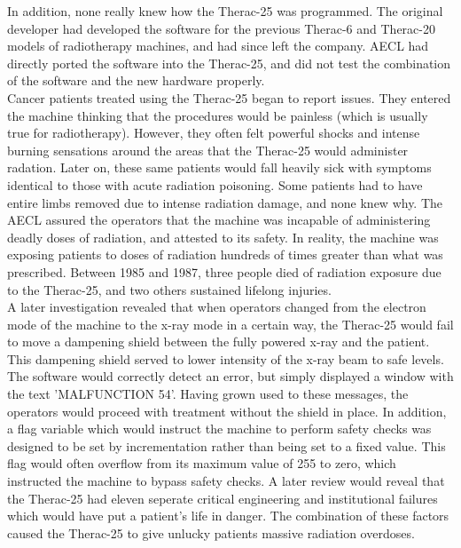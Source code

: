 \documentclass{article}
\begin{document}
In addition, none really knew how the Therac-25 was programmed. The original developer had developed the software for the previous Therac-6 and Therac-20 models of radiotherapy machines, and had since left the company. AECL had directly ported the software into the Therac-25, and did not test the combination of the software and the new hardware properly.\\

Cancer patients treated using the Therac-25 began to report issues. They entered the machine thinking that the procedures would be painless (which is usually true for radiotherapy). However, they often felt powerful shocks and intense burning sensations around the areas that the Therac-25 would administer radation. Later on, these same patients would fall heavily sick with symptoms identical to those with acute radiation poisoning. Some patients had to have entire limbs removed due to intense radiation damage, and none knew why. The AECL assured the operators that the machine was incapable of administering deadly doses of radiation, and attested to its safety.\cite{leveson-turner-1993} In reality, the machine was exposing patients to doses of radiation hundreds of times greater than what was prescribed.\cite{baase-henry-2019} Between 1985 and 1987, three people died of radiation exposure due to the Therac-25, and two others sustained lifelong injuries.\\

A later investigation revealed that when operators changed from the electron mode of the machine to the x-ray mode in a certain way, the Therac-25 would fail to move a dampening shield between the fully powered x-ray and the patient. This dampening shield served to lower intensity of the x-ray beam to safe levels. The software would correctly detect an error, but simply displayed a window with the text 'MALFUNCTION 54'. Having grown used to these messages, the operators would proceed with treatment without the shield in place. In addition, a flag variable which would instruct the machine to perform safety checks was designed to be set by incrementation rather than being set to a fixed value. This flag would often overflow from its maximum value of 255 to zero, which instructed the machine to bypass safety checks. A later review would reveal that the Therac-25 had eleven seperate critical engineering and institutional failures which would have put a patient's life in danger. The combination of these factors caused the Therac-25 to give unlucky patients massive radiation overdoses.\\
\end{document}
